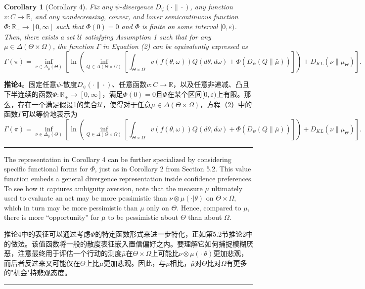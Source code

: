 \documentclass[12pt,a4paper]{article}
\newenvironment{original}
  {\par\noindent\color{black}\smallskip}
  {\par\smallskip}
\newenvironment{translation}
  {\par\noindent\color{blue!70!black}\smallskip}
  {\par\medskip\hrule\medskip}
\newtheorem{corollary}[theorem]{Corollary}
\begin{document}
\begin{corollary}[Corollary 4]
Fix any $\psi$-divergence $D_\psi(\cdot\|\cdot)$, any function $v: C \to \mathbb{R}$, and any nondecreasing, convex, and lower semicontinuous function $\Phi: \mathbb{R}_+ \to [0, \infty]$ such that $\Phi(0) = 0$ and $\Phi$ is finite on some interval $[0, \varepsilon)$. Then, there exists a set $\mathcal{U}$ satisfying Assumption 1 such that for any $\mu \in \Delta(\Theta \times \Omega)$, the function $\Gamma$ in Equation (2) can be equivalently expressed as
\[
\Gamma(\pi) = \inf_{\nu \in \Delta_\mu(\Theta)} \left[ \ln\left( \inf_{Q \in \Delta(\Theta \times \Omega)} \left[ \int_{\Theta \times \Omega} v(f(\theta, \omega)) Q(d\theta, d\omega) + \Phi(D_\psi(Q\|\bar{\mu})) \right] \right) + D_{KL}(\nu\|\mu_\Theta) \right].
\]
\end{corollary}
\begin{translation}
\textbf{推论4}。固定任意$\psi$-散度$D_\psi(\cdot\|\cdot)$、任意函数$v: C \to \mathbb{R}$，以及任意非递减、凸且下半连续的函数$\Phi: \mathbb{R}_+ \to [0, \infty]$，满足$\Phi(0) = 0$且$\Phi$在某个区间$[0, \varepsilon)$上有限。那么，存在一个满足假设1的集合$\mathcal{U}$，使得对于任意$\mu \in \Delta(\Theta \times \Omega)$，方程（2）中的函数$\Gamma$可以等价地表示为
\[
\Gamma(\pi) = \inf_{\nu \in \Delta_\mu(\Theta)} \left[ \ln\left( \inf_{Q \in \Delta(\Theta \times \Omega)} \left[ \int_{\Theta \times \Omega} v(f(\theta, \omega)) Q(d\theta, d\omega) + \Phi(D_\psi(Q\|\bar{\mu})) \right] \right) + D_{KL}(\nu\|\mu_\Theta) \right].
\]
\end{translation}

\begin{original}
The representation in Corollary 4 can be further specialized by considering specific functional forms for $\Phi$, just as in Corollary 2 from Section 5.2. This value function embeds a general divergence representation inside confidence preferences. To see how it captures ambiguity aversion, note that the measure $\bar{\mu}$ ultimately used to evaluate an act may be more pessimistic than $\nu \otimes \mu(\cdot|\theta)$ on $\Theta \times \Omega$, which in turn may be more pessimistic than $\mu$ only on $\Theta$. Hence, compared to $\mu$, there is more ``opportunity'' for $\bar{\mu}$ to be pessimistic about $\Theta$ than about $\Omega$.
\end{original}
\begin{translation}
推论4中的表征可以通过考虑$\Phi$的特定函数形式来进一步特化，正如第5.2节推论2中的做法。该值函数将一般的散度表征嵌入置信偏好之内。要理解它如何捕捉模糊厌恶，注意最终用于评估一个行动的测度$\bar{\mu}$在$\Theta \times \Omega$上可能比$\nu \otimes \mu(\cdot|\theta)$更加悲观，而后者反过来又可能仅在$\Theta$上比$\mu$更加悲观。因此，与$\mu$相比，$\bar{\mu}$对$\Theta$比对$\Omega$有更多的"机会"持悲观态度。
\end{translation}
\end{document}
